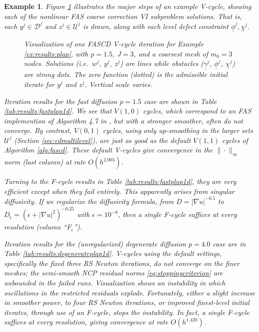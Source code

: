 \documentclass[letterpaper,final,12pt,reqno]{amsart}
\theoremstyle{cstyle}
\theoremstyle{cstyle*}
\theoremstyle{dstyle}
\newtheorem{example}[theorem]{Example}
\numberwithin{equation}{section}
\numberwithin{figure}{section}
\numberwithin{table}{section}
\numberwithin{theorem}{section}
\newcommand{\eps}{\epsilon}
\newcommand{\grad}{\nabla}
\begin{document}
\begin{example}
Figure \ref{fig:imagesvcycle} illustrates the major steps of an example V-cycle, showing each of the nonlinear FAS coarse correction VI subproblem solutions.  That is, each $y^j \in \mathcal{D}^j$ and $z^j \in \mathcal{U}^j$ is drawn, along with each level defect constraint $\underline{\phi}^j,\underline{\chi}^j$.

\begin{figure}[ht]
\begin{center}

\end{center}
\caption{Visualization of one FASCD V-cycle iteration for Example \ref{ex:results:plap}, with $p=1.5$, $J=3$, and a coarsest mesh of $m_0=3$ nodes.  Solutions (i.e.~$w^j$, $y^j$, $z^j$) are lines while obstacles ($\underline{\gamma}^j$, $\underline{\phi}^j$, $\underline{\chi}^j$) are strong dots.  The zero function (dotted) is the admissible initial iterate for $y^j$ and $z^j$.  Vertical scale varies.}
\label{fig:imagesvcycle}
\end{figure}

Iteration results for the fast diffusion $p=1.5$ case are shown in Table \ref{tab:results:fastplap1d}.  We see that $V(1,0)$ cycles, which correspond to an FAS implemention of Algorithm 4.7 in \cite{GraeserKornhuber2009}, but with a stronger smoother, often do not converge.  By contrast, $V(0,1)$ cycles, using only up-smoothing in the larger sets $\mathcal{U}^j$ (Section \ref{sec:cdmultilevel}), are just as good as the default $V(1,1)$ cycles of Algorithm \ref{alg:fascd}.  These default V-cycles give convergence in the $\|\cdot\|_\infty$ norm (last column) at rate $O(h^{2.005})$.

Turning to the F-cycle results in Table \ref{tab:results:fastplap1d}, they are very efficient except when they fail entirely.  This apparently arises from singular diffusivity.  If we regularize the diffusivity formula, from $D=|\grad u|^{-0.5}$ to $D_\eps = \left(\eps + |\grad u|^2\right)^{-0.25}$ with $\eps=10^{-8}$, then a single F-cycle suffices at every resolution (column ``F$_\eps$'').

Iteration results for the (unregularized) degenerate diffusion $p=4.0$ case are in Table \ref{tab:results:degenerateplap1d}.  V-cycles using the default settings, specifically the fixed three RS Newton iterations, do not converge on the finer meshes; the semi-smooth NCP residual norms \eqref{eq:stoppingcriterion} are unbounded in the failed runs.  Visualization shows an instability in which oscillations in the restricted residuals explode.  Fortunately, either a slight increase in smoother power, to four RS Newton iterations, or improved finest-level initial iterates, through use of an F-cycle, stops the instability.  In fact, a single F-cycle suffices at every resolution, giving convergence at rate $O(h^{1.420})$.
\end{example}
\end{document}
